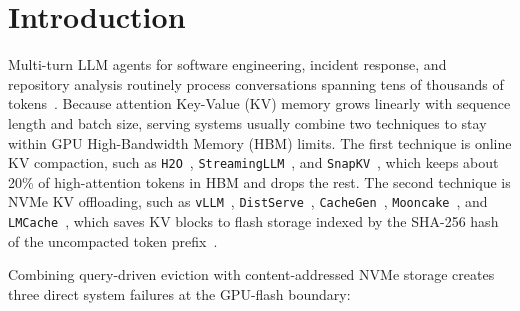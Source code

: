 \documentclass[pdflatex,sn-mathphys-num]{sn-jnl}
\theoremstyle{thmstyleone}
\begin{document}

\maketitle

\section{Introduction}\label{sec:intro}

Multi-turn LLM agents for software engineering, incident response, and repository analysis routinely process conversations spanning tens of thousands of tokens~\cite{jimenez2024swebench,zheng2024sglang}. Because attention Key-Value (KV) memory grows linearly with sequence length and batch size, serving systems usually combine two techniques to stay within GPU High-Bandwidth Memory (HBM) limits. The first technique is online KV compaction, such as \texttt{H2O}~\cite{zhang2023h2o}, \texttt{StreamingLLM}~\cite{xiao2024streamingllm}, and \texttt{SnapKV}~\cite{li2024snapkv}, which keeps about 20\% of high-attention tokens in HBM and drops the rest. The second technique is NVMe KV offloading, such as \texttt{vLLM}~\cite{kwon2023vllm}, \texttt{DistServe}~\cite{zhong2024distserve}, \texttt{CacheGen}~\cite{liu2024cachegen}, \texttt{Mooncake}~\cite{qin2025mooncake}, and \texttt{LMCache}~\cite{cheng2025lmcache}, which saves KV blocks to flash storage indexed by the SHA-256 hash of the uncompacted token prefix~\cite{quinlan2002venti}.

Combining query-driven eviction with content-addressed NVMe storage creates three direct system failures at the GPU-flash boundary:
\end{document}
